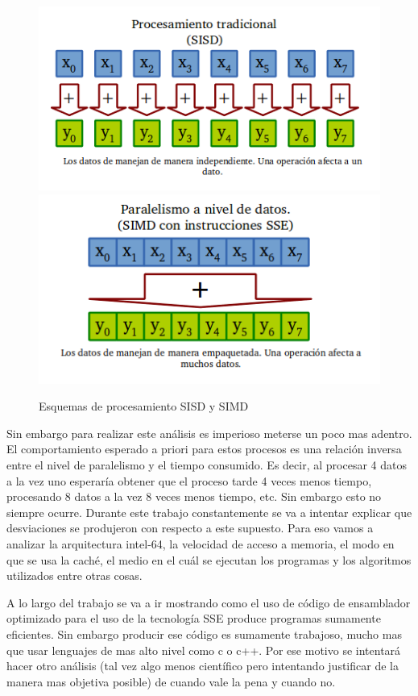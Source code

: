 \begin{figure}[h]
\begin{center}
  \includegraphics[scale=0.4]{secciones/introduccion/imagenes/SISD.png}
    \includegraphics[scale=0.4]{secciones/introduccion/imagenes/SIMD.png}
\end{center}
\caption{Esquemas de procesamiento SISD y SIMD}
\label{fig:SISD-SIMD}
\end{figure}

	Sin embargo para realizar este análisis es imperioso meterse un poco mas adentro.
El comportamiento esperado a priori para estos procesos es una relación inversa entre
el nivel de paralelismo y el tiempo consumido. Es decir, al procesar 4 datos a la vez
uno esperaría obtener que el proceso tarde 4 veces menos tiempo, procesando 8 datos
a la vez 8 veces menos tiempo, etc. Sin embargo esto no siempre ocurre. Durante
este trabajo constantemente se va a intentar explicar que desviaciones se 
produjeron con respecto a este supuesto. Para eso vamos a analizar la arquitectura
intel-64, la velocidad de acceso a memoria, el modo en que se usa la caché,
el medio en el cuál se ejecutan los programas y los algoritmos utilizados entre
otras cosas.

	A lo largo del trabajo se va a ir mostrando como el uso de código de ensamblador
optimizado para el uso de la tecnología SSE produce programas sumamente eficientes. Sin embargo
producir ese código es sumamente trabajoso, mucho mas que usar lenguajes de mas alto nivel como
c o c++. Por ese motivo se intentará hacer otro análisis (tal vez algo menos científico
pero intentando justificar de la manera mas objetiva posible) de cuando vale la pena y cuando no.

